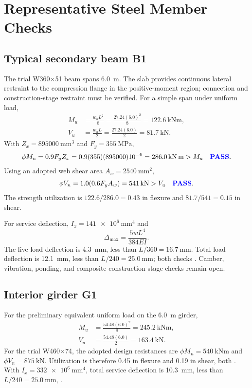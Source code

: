 \section{Representative Steel Member Checks}

\subsection{Typical secondary beam B1}
The trial W360$\times$51 beam spans \SI{6.0}{\metre}. The slab provides continuous
lateral restraint to the compression flange in the positive-moment region; connection
and construction-stage restraint must be verified. For a simple span under uniform
load,
\begin{align}
  M_u &= \frac{w_uL^2}{8}
       = \frac{27.24(6.0)^2}{8}
       = \SI{122.6}{\kilo\newton\metre},\\
  V_u &= \frac{w_uL}{2}
       = \frac{27.24(6.0)}{2}
       = \SI{81.7}{\kilo\newton}.
\end{align}
With $Z_x=\SI{895000}{\milli\metre\cubed}$ and $F_y=\SI{355}{\mega\pascal}$,
\begin{equation}
  \phi M_n=0.9F_yZ_x
  =0.9(355)(895000)10^{-6}
  =\SI{286.0}{\kilo\newton\metre}>M_u \quad \textcolor{blue}{\textbf{PASS}}.
\end{equation}
Using an adopted web shear area $A_w=\SI{2540}{\milli\metre\squared}$,
\begin{equation}
  \phi V_n=1.0(0.6F_yA_w)=\SI{541}{\kilo\newton}>V_u \quad \textcolor{blue}{\textbf{PASS}}.
\end{equation}
The strength utilization is $122.6/286.0=0.43$ in flexure and $81.7/541=0.15$ in
shear.

For service deflection, $I_x=\SI{141e6}{\milli\metre\tothe{4}}$ and
\begin{equation}
  \Delta_{\max}=\frac{5wL^4}{384EI}.
\end{equation}
The live-load deflection is \SI{4.3}{\milli\metre}, less than
$L/360=\SI{16.7}{\milli\metre}$. Total-load deflection is
\SI{12.1}{\milli\metre}, less than $L/240=\SI{25.0}{\milli\metre}$; both checks
\ok. Camber, vibration, ponding, and composite construction-stage checks remain
open.

\subsection{Interior girder G1}
For the preliminary equivalent uniform load on the \SI{6.0}{\metre} girder,
\begin{align}
  M_u &= \frac{54.48(6.0)^2}{8}
       = \SI{245.2}{\kilo\newton\metre},\\
  V_u &= \frac{54.48(6.0)}{2}
       = \SI{163.4}{\kilo\newton}.
\end{align}
For the trial W460$\times$74, the adopted design resistances are
$\phi M_n=\SI{540}{\kilo\newton\metre}$ and
$\phi V_n=\SI{875}{\kilo\newton}$. Utilization is therefore 0.45 in flexure and
0.19 in shear, both \ok. With $I_x=\SI{332e6}{\milli\metre\tothe{4}}$, total
service deflection is \SI{10.3}{\milli\metre}, less than
$L/240=\SI{25.0}{\milli\metre}$, \ok.

